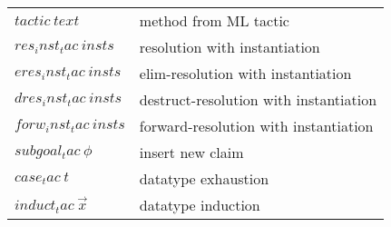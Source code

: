 \begin{tabular}{ll}
  $tactic~text$ & method from ML tactic \\
  $res_inst_tac~insts$ & resolution with instantiation \\
  $eres_inst_tac~insts$ & elim-resolution with instantiation \\
  $dres_inst_tac~insts$ & destruct-resolution with instantiation \\
  $forw_inst_tac~insts$ & forward-resolution with instantiation \\
  $subgoal_tac~\phi$ & insert new claim \\
  $case_tac~t$ & datatype exhaustion \\
  $induct_tac~\vec x$ & datatype induction \\
\end{tabular}


